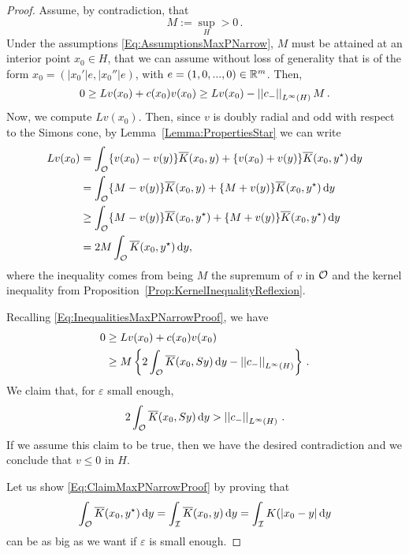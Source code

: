 \begin{proof}
	Assume, by contradiction, that
	$$
	M := \sup_H > 0\,.
	$$
	Under the assumptions \eqref{Eq:AssumptionsMaxPNarrow}, $M$ must be attained at an interior point $x_0 \in H$, that we can assume without loss of generality that is of the form $x_0 = (|x_0'|e,|x_0''|e)$, with $e=(1,0,...,0)\in\mathbb{R}^m$. Then,
	\begin{equation}
	\label{Eq:InequalitiesMaxPNarrowProof}
	0 \geq L v(x_0) + c(x_0)v(x_0) \geq L v(x_0) - \left | \left |{c_-} \right | \right |_{L^\infty(H)}M\,.
	\end{equation} 
	Now, we compute $L v(x_0)$. Then, since $v$ is doubly radial and odd with respect to the Simons cone, by Lemma~\ref{Lemma:PropertiesStar} we can write
	\begin{align*}
	Lv(x_0) &= \int_{\mathcal{O}} \{v(x_0) - v(y)\} \overline{K}(x_0,y) + \{v(x_0) + v(y)\} \overline{K}(x_0,y^\star) \,\mathrm{d} y \\
    &= \int_{\mathcal{O}} \{M - v(y)\} \overline{K}(x_0,y) + \{M + v(y)\} \overline{K}(x_0,y^\star) \,\mathrm{d} y \\
    &\geq \int_{\mathcal{O}} \{M - v(y)\} \overline{K}(x_0,y^\star) + \{M + v(y)\} \overline{K}(x_0,y^\star) \,\mathrm{d} y \\
    &=2M \int_{\mathcal{O}} \overline{K}(x_0,y^\star)\,\mathrm{d} y,
	\end{align*}
    where the inequality comes from being $M$ the supremum of $v$ in $\mathcal{O}$ and the kernel inequality from Proposition~\ref{Prop:KernelInequalityReflexion}.   
    
	Recalling \eqref{Eq:InequalitiesMaxPNarrowProof}, we have
	\begin{align*}
	0& \geq L v(x_0) + c(x_0)v(x_0)  \\
	& \geq M \left\{ 2 \int_{\mathcal{O}} \overline{K}(x_0,Sy)\,\mathrm{d} y - \left | \left |{c_-} \right | \right |_{L^\infty(H)}
	\right\}\,.
	\end{align*}
	We claim that, for $\varepsilon$ small enough,
	\begin{equation}
	\label{Eq:ClaimMaxPNarrowProof}
	 2 \int_{\mathcal{O}} \overline{K}(x_0,Sy)\,\mathrm{d} y > \left | \left |{c_-} \right | \right |_{L^\infty(H)}\,.
	\end{equation}
	If we assume this claim to be true, then we have the desired contradiction and we conclude that $v \leq 0$ in $H$.
	
	Let us show \eqref{Eq:ClaimMaxPNarrowProof} by proving that
	$$
	\int_{\mathcal{O}} \overline{K}(x_0,y^\star)\,\mathrm{d} y = \int_{\mathcal{I}} \overline{K}(x_0,y)\,\mathrm{d} y = \int_{\mathcal{I}} K(|x_0-y|\,\mathrm{d} y
	$$
	can be as big as we want if $\varepsilon$ is small enough. 
    

\end{proof}
